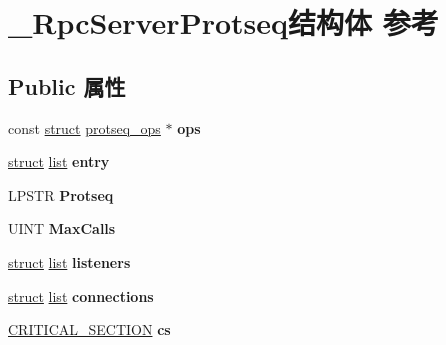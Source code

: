 \hypertarget{struct___rpc_server_protseq}{}\section{\+\_\+\+Rpc\+Server\+Protseq结构体 参考}
\label{struct___rpc_server_protseq}
\subsection*{Public 属性}
\begin{DoxyCompactItemize}
\item 
\mbox{\label{struct___rpc_server_protseq_a4e74b421deb1478affef3523932a7819}} 
const \hyperlink{interfacestruct}{struct} \hyperlink{structprotseq__ops}{protseq\+\_\+ops} $\ast$ {\bfseries ops}
\item 
\mbox{\label{struct___rpc_server_protseq_a0a9b5dd5bd32e279e1de2f806477bacb}} 
\hyperlink{interfacestruct}{struct} \hyperlink{classlist}{list} {\bfseries entry}
\item 
\mbox{\label{struct___rpc_server_protseq_a68482df0e0baabb8d51fb1c48f3a9b5a}} 
L\+P\+S\+TR {\bfseries Protseq}
\item 
\mbox{\label{struct___rpc_server_protseq_a27757ee29c14bb58965f93f971093ca6}} 
U\+I\+NT {\bfseries Max\+Calls}
\item 
\mbox{\label{struct___rpc_server_protseq_a5f8bef5a4e18616428b3605d02531e5f}} 
\hyperlink{interfacestruct}{struct} \hyperlink{classlist}{list} {\bfseries listeners}
\item 
\mbox{\label{struct___rpc_server_protseq_a4ea6b728d1f53ede48475b44ba6b4373}} 
\hyperlink{interfacestruct}{struct} \hyperlink{classlist}{list} {\bfseries connections}
\item 
\mbox{\label{struct___rpc_server_protseq_a980f2e03ee88fd87450f33d525c46d45}} 
\hyperlink{struct___c_r_i_t_i_c_a_l___s_e_c_t_i_o_n}{C\+R\+I\+T\+I\+C\+A\+L\+\_\+\+S\+E\+C\+T\+I\+ON} {\bfseries cs}
\item 

\end{DoxyCompactItemize}
